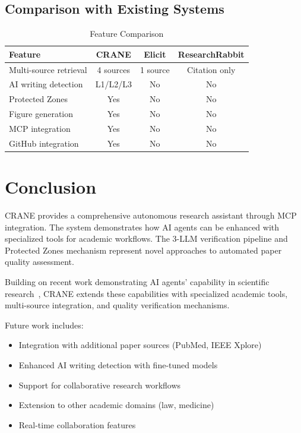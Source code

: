 \documentclass{article}
\begin{document}
\subsection{Comparison with Existing Systems}

\begin{table}[h]
\centering
\begin{tabular}{lccc}
\toprule
\textbf{Feature} & \textbf{CRANE} & \textbf{Elicit} & \textbf{ResearchRabbit} \\
\midrule
Multi-source retrieval & 4 sources & 1 source & Citation only \\
AI writing detection & L1/L2/L3 & No & No \\
Protected Zones & Yes & No & No \\
Figure generation & Yes & No & No \\
MCP integration & Yes & No & No \\
GitHub integration & Yes & No & No \\
\bottomrule
\end{tabular}
\caption{Feature Comparison}
\label{tab:comparison}
\end{table}

\section{Conclusion}
\label{sec:conclusion}

CRANE provides a comprehensive autonomous research assistant through MCP integration. The system demonstrates how AI agents can be enhanced with specialized tools for academic workflows. The 3-LLM verification pipeline and Protected Zones mechanism represent novel approaches to automated paper quality assessment.

Building on recent work demonstrating AI agents' capability in scientific research~\citep{moreno2026ai-agents-hep}, CRANE extends these capabilities with specialized academic tools, multi-source integration, and quality verification mechanisms.

Future work includes:
\begin{itemize}
    \item Integration with additional paper sources (PubMed, IEEE Xplore)
    \item Enhanced AI writing detection with fine-tuned models
    \item Support for collaborative research workflows
    \item Extension to other academic domains (law, medicine)
    \item Real-time collaboration features
\end{itemize}



\end{document}

